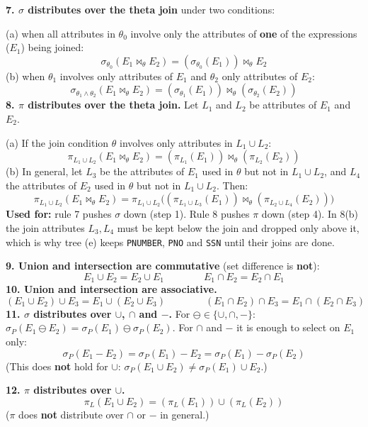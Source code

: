 \documentclass[10pt,a4paper]{article}
\begin{document}
\begin{keybox}
\textbf{7. $\sigma$ distributes over the theta join} under two conditions:

(a) when all attributes in $\theta_0$ involve only the attributes of \textbf{one} of the expressions ($E_1$) being joined:
\[ \sigma_{\theta_0}(E_1 \bowtie_{\theta} E_2) = (\sigma_{\theta_0}(E_1)) \bowtie_{\theta} E_2 \]
(b) when $\theta_1$ involves only attributes of $E_1$ and $\theta_2$ only attributes of $E_2$:
\[ \sigma_{\theta_1 \wedge \theta_2}(E_1 \bowtie_{\theta} E_2) = (\sigma_{\theta_1}(E_1)) \bowtie_{\theta} (\sigma_{\theta_2}(E_2)) \]
\textbf{8. $\pi$ distributes over the theta join.} Let $L_1$ and $L_2$ be attributes of $E_1$ and $E_2$.

(a) If the join condition $\theta$ involves only attributes in $L_1 \cup L_2$:
\[ \pi_{L_1 \cup L_2}(E_1 \bowtie_{\theta} E_2) = (\pi_{L_1}(E_1)) \bowtie_{\theta} (\pi_{L_2}(E_2)) \]
(b) In general, let $L_3$ be the attributes of $E_1$ used in $\theta$ but not in $L_1 \cup L_2$, and $L_4$ the attributes of $E_2$ used in $\theta$ but not in $L_1 \cup L_2$. Then:
\[ \pi_{L_1 \cup L_2}(E_1 \bowtie_{\theta} E_2) = \pi_{L_1 \cup L_2}\big((\pi_{L_1 \cup L_3}(E_1)) \bowtie_{\theta} (\pi_{L_2 \cup L_4}(E_2))\big) \]
\textbf{Used for:} rule 7 pushes $\sigma$ down (step 1). Rule 8 pushes $\pi$ down (step 4). In 8(b) the join attributes $L_3, L_4$ must be kept below the join and dropped only above it, which is why tree (e) keeps \texttt{PNUMBER}, \texttt{PNO} and \texttt{SSN} until their joins are done.
\end{keybox}

\begin{keybox}
\textbf{9. Union and intersection are commutative} (set difference is \textbf{not}):
\[ E_1 \cup E_2 = E_2 \cup E_1 \qquad\qquad E_1 \cap E_2 = E_2 \cap E_1 \]
\textbf{10. Union and intersection are associative.}
\[ (E_1 \cup E_2) \cup E_3 = E_1 \cup (E_2 \cup E_3) \qquad\qquad (E_1 \cap E_2) \cap E_3 = E_1 \cap (E_2 \cap E_3) \]
\textbf{11. $\sigma$ distributes over $\cup$, $\cap$ and $-$.} For $\ominus \in \{\cup, \cap, -\}$: $\sigma_P(E_1 \ominus E_2) = \sigma_P(E_1) \ominus \sigma_P(E_2)$. For $\cap$ and $-$ it is enough to select on $E_1$ only:
\[ \sigma_P(E_1 - E_2) = \sigma_P(E_1) - E_2 = \sigma_P(E_1) - \sigma_P(E_2) \]
(This does \textbf{not} hold for $\cup$: $\sigma_P(E_1 \cup E_2) \neq \sigma_P(E_1) \cup E_2$.)

\textbf{12. $\pi$ distributes over $\cup$.}
\[ \pi_L(E_1 \cup E_2) = (\pi_L(E_1)) \cup (\pi_L(E_2)) \]
($\pi$ does \textbf{not} distribute over $\cap$ or $-$ in general.)
\end{keybox}
\end{document}
